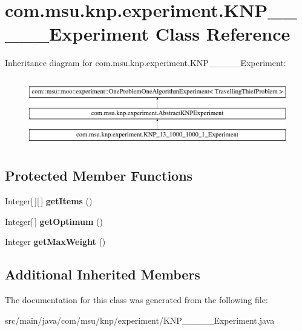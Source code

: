 \hypertarget{classcom_1_1msu_1_1knp_1_1experiment_1_1KNP__13__1000__1000__1__Experiment}{\section{com.\-msu.\-knp.\-experiment.\-K\-N\-P\-\_\-\_\-\_\-\_\-\_\-\-Experiment Class Reference}
\label{classcom_1_1msu_1_1knp_1_1experiment_1_1KNP__13__1000__1000__1__Experiment}
}
Inheritance diagram for com.\-msu.\-knp.\-experiment.\-K\-N\-P\-\_\-\_\-\_\-\_\-\_\-\-Experiment\-:\begin{figure}[H]
\begin{center}
\leavevmode
\includegraphics[height=3.000000cm]{classcom_1_1msu_1_1knp_1_1experiment_1_1KNP__13__1000__1000__1__Experiment}
\end{center}
\end{figure}
\subsection*{Protected Member Functions}
\begin{DoxyCompactItemize}
\item 
\hypertarget{classcom_1_1msu_1_1knp_1_1experiment_1_1KNP__13__1000__1000__1__Experiment_a03c2a231cdbf762b238e117a80fa3e7b}{Integer\mbox{[}$\,$\mbox{]}\mbox{[}$\,$\mbox{]} {\bfseries get\-Items} ()}\label{classcom_1_1msu_1_1knp_1_1experiment_1_1KNP__13__1000__1000__1__Experiment_a03c2a231cdbf762b238e117a80fa3e7b}

\item 
\hypertarget{classcom_1_1msu_1_1knp_1_1experiment_1_1KNP__13__1000__1000__1__Experiment_a9ca4349b355a7bbe2ccafd7a03fa02c2}{Integer\mbox{[}$\,$\mbox{]} {\bfseries get\-Optimum} ()}\label{classcom_1_1msu_1_1knp_1_1experiment_1_1KNP__13__1000__1000__1__Experiment_a9ca4349b355a7bbe2ccafd7a03fa02c2}

\item 
\hypertarget{classcom_1_1msu_1_1knp_1_1experiment_1_1KNP__13__1000__1000__1__Experiment_ab572a8d51bd75668b8c666a05383302d}{Integer {\bfseries get\-Max\-Weight} ()}\label{classcom_1_1msu_1_1knp_1_1experiment_1_1KNP__13__1000__1000__1__Experiment_ab572a8d51bd75668b8c666a05383302d}

\end{DoxyCompactItemize}
\subsection*{Additional Inherited Members}


The documentation for this class was generated from the following file\-:\begin{DoxyCompactItemize}
\item 
src/main/java/com/msu/knp/experiment/K\-N\-P\-\_\-\_\-\_\-\_\-\_\-\-Experiment.\-java\end{DoxyCompactItemize}
